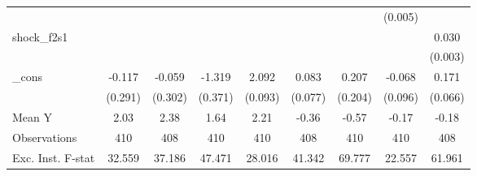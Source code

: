 {\begin{tabular}{l*{8}{c}}
            &                     &                     &                     &                     &                     &                     &     (0.005)         &                     \\
\addlinespace
shock\_f2s1  &                     &                     &                     &                     &                     &                     &                     &       0.030\sym{***}\\
            &                     &                     &                     &                     &                     &                     &                     &     (0.003)         \\
\addlinespace
\_cons      &      -0.117         &      -0.059         &      -1.319\sym{***}&       2.092\sym{***}&       0.083         &       0.207         &      -0.068         &       0.171\sym{**} \\
            &     (0.291)         &     (0.302)         &     (0.371)         &     (0.093)         &     (0.077)         &     (0.204)         &     (0.096)         &     (0.066)         \\
\midrule
Mean Y      &        2.03         &        2.38         &        1.64         &        2.21         &       -0.36         &       -0.57         &       -0.17         &       -0.18         \\
Observations&         410         &         408         &         410         &         410         &         408         &         410         &         410         &         408         \\
Exc. Inst. F-stat&      32.559         &      37.186         &      47.471         &      28.016         &      41.342         &      69.777         &      22.557         &      61.961         \\
\bottomrule
\end{tabular}
}

